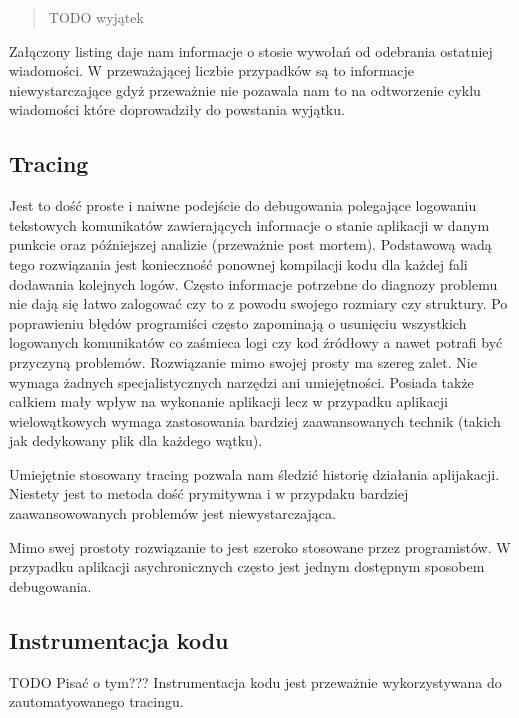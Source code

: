 \begin{quote}
TODO wyjątek
\end{quote}

Załączony listing daje nam informacje o stosie wywołań od odebrania ostatniej wiadomości. W przeważającej liczbie przypadków są to informacje niewystarczające gdyż przeważnie nie pozawala nam to na odtworzenie cyklu wiadomości które doprowadziły do powstania wyjątku.

\subsection{Tracing}

Jest to dość proste i naiwne podejście do debugowania polegające logowaniu tekstowych komunikatów zawierających informacje o stanie aplikacji w danym punkcie oraz późniejszej analizie (przeważnie post mortem). Podstawową wadą tego rozwiązania jest konieczność ponownej kompilacji kodu dla każdej fali dodawania kolejnych logów. Często informacje potrzebne do diagnozy problemu nie dają się łatwo zalogować czy to z powodu swojego rozmiary czy struktury. Po poprawieniu błędów programiści często zapominają o usunięciu wszystkich logowanych komunikatów co zaśmieca logi czy kod źródłowy a nawet potrafi być przyczyną problemów.
Rozwiązanie mimo swojej prosty ma szereg zalet. Nie wymaga żadnych specjalistycznych narzędzi ani umiejętności. Posiada także całkiem mały wpływ na wykonanie aplikacji lecz w przypadku aplikacji wielowątkowych wymaga zastosowania bardziej zaawansowanych technik (takich jak dedykowany plik dla każdego wątku).

Umiejętnie stosowany tracing pozwala nam śledzić historię działania aplijakacji. Niestety jest to metoda dość prymitywna i w przypdaku bardziej zaawansowowanych problemów jest niewystarczająca.
 
Mimo swej prostoty rozwiązanie to jest szeroko stosowane przez programistów. W przypadku aplikacji asychronicznych często jest jednym dostępnym sposobem debugowania. 

\subsection{Instrumentacja kodu}

TODO Pisać o tym???
Instrumentacja kodu jest przeważnie wykorzystywana do zautomatyowanego tracingu.


